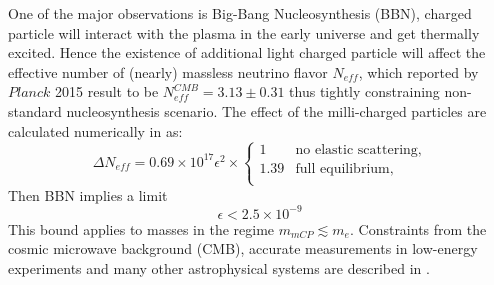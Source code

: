 One of the major observations is Big-Bang Nucleosynthesis (BBN), charged particle will interact with the plasma in the early universe and get thermally excited. Hence the existence of additional light charged particle will affect the effective number of (nearly) massless neutrino flavor $N_{eff}$, which reported by $Planck$ 2015 result to be $N_{eff}^{CMB} = 3.13 \pm 0.31$ thus tightly constraining non-standard nucleosynthesis scenario. The effect of the milli-charged particles are calculated numerically in \cite{mCPwithBBN} as:
\begin{equation}
    \Delta N_{eff} = 0.69 \times 10^{17} \epsilon^2 \times \begin{cases}
               1 &\text{no elastic scattering,}\\
               1.39 &\text{full equilibrium,}\\
            \end{cases}
\end{equation}
Then BBN implies a limit
\begin{equation}
    \epsilon < 2.5 \times10 ^{-9}
\end{equation}
This bound applies to masses in the regime $m_{mCP} \lesssim m_e$.
Constraints from the cosmic microwave background (CMB), accurate measurements in low-energy experiments and many other astrophysical systems are described in \cite{mCPCMB,mCPCMB2,mCPnoncollider,mCPlambshift,mCPcosmology,mCPastro,mCPaccecavity,mCPPositronium,mCPLaser,mCPHubble,mCPCoulomb}.